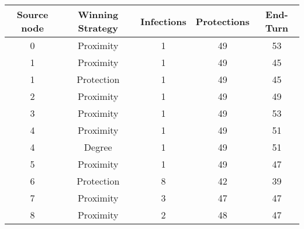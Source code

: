 \documentclass[results.tex]{subfiles}
\begin{document}
    \begin{center}
        \begin{tabular}{| c || c | c | c | c |}
            \hline
            {\bfseries Source node} & {\bfseries Winning Strategy} & {\bfseries Infections} & {\bfseries Protections}
            & {\bfseries End-Turn}
            \\  %
            \hline\hline
            0                       & Proximity                    & 1                      & 49                      & 53                   \\
            \hline
            1                       & Proximity                    & 1                      & 49                      & 45                   \\
            \hline
            1                       & Protection                   & 1                      & 49                      & 45                   \\
            \hline
            2                       & Proximity                    & 1                      & 49                      & 49                   \\
            \hline
            3                       & Proximity                    & 1                      & 49                      & 53                   \\
            \hline
            4                       & Proximity                    & 1                      & 49                      & 51                   \\
            \hline
            4                       & Degree                       & 1                      & 49                      & 51                   \\
            \hline
            5                       & Proximity                    & 1                      & 49                      & 47                   \\
            \hline
            6                       & Protection                   & 8                      & 42                      & 39                   \\
            \hline
            7                       & Proximity                    & 3                      & 47                      & 47                   \\
            \hline
            8                       & Proximity                    & 2                      & 48                      & 47                   \\

\end{tabular}
\end{center}
\end{document}
